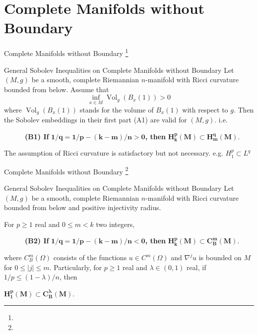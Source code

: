 \documentclass[xcolor=table,dvipsnames,svgnames,aspectratio=169,fontset=windows]{ctexbeamer}
\begin{document}

\section{Complete Manifolds without Boundary}

\begin{frame}{Complete Manifolds without Boundary \footnote{} }
  \begin{alertblock}{General Sobolev Inequalities on Complete Manifolds without Boundary}
  Let $(M, g)$ be a smooth, complete Riemannian $n$-manifold with Ricci curvature bounded from below. Assume that
  $$
  \inf _{x \in M} \operatorname{Vol}_g\left(B_x(1)\right)>0
  $$
  where $\operatorname{Vol}_g\left(B_x(1)\right)$ stands for the volume of $B_x(1)$ with respect to $g$. Then the Sobolev embeddings in their first part (A1) are valid for $(M, g)$. i.e.
  
  \vskip 5pt
  ~~~~~~\textbf{(B1) If} $\bm{1/q=1 / p-(k-m) / n > 0}$\textbf{, then} $\bm{H_k^p(M) \subset H_m^q(M)}$.
\end{alertblock}
The assumption of Ricci curvature is satisfactory but not necessary. e.g. $H_1^p\subset L^q$
\end{frame}

\begin{frame}{Complete Manifolds without Boundary \footnote{} }
  \begin{alertblock}{General Sobolev Inequalities on Complete Manifolds without Boundary}
    Let $(M, g)$ be a smooth, complete Riemannian $n$-manifold with Ricci curvature bounded from below and positive injectivity radius. 
    
    \vskip 5pt
    For $p \geq 1$ real and $0\leq m<k$ two integers,   
  
    \vskip 8pt
  ~~~~~~\textbf{(B2) If} $\bm{1/q=1 / p-(k-m) / n < 0}$\textbf{, then} $\bm{H_k^p(M) \subset C_B^m(M)}$.
  
    \vskip 8pt
    where $C_B^m(\Omega)$ consists of the functions $u \in C^m(\Omega)$ and $\nabla^ju$ is bounded on $M$ for $0\leq |j|\leq m$. 
    Particularly, for $p \geq 1$ real and $\lambda \in(0,1)$ real, if $1 / p \leq(1-\lambda) / n$, then 
    
    \vskip 3pt
    $\bm{H_1^p(M) \subset C_B^\lambda(M)}$.



\end{alertblock}
\end{frame}
\end{document}
